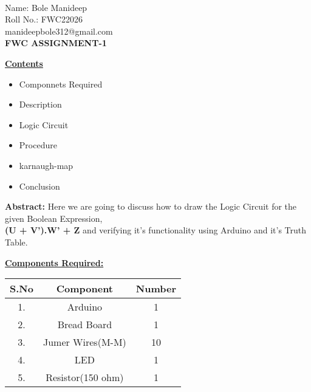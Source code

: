 \documentclass[10pt,a4paper]{report}
\begin{document}
 \vspace{3mm}\\ \raggedleft Name: Bole Manideep\vspace{2mm}\\ \raggedleft Roll No.: FWC22026\vspace{2mm}\\ \raggedleft manideepbole312@gmail.com \vspace{10mm}
\\ \centering \Large \textbf{FWC ASSIGNMENT-1} \normalsize \vspace{15mm}
\begin{multicols}{2} \raggedright \large \textbf{\underline{Contents}} \normalsize \vspace{5mm}
\begin{itemize}
\raggedright  \item Componnets Required \item Description \item Logic Circuit \item Procedure \item karnaugh-map \item Conclusion
\end{itemize} \vspace{5mm}
\raggedright \hspace{10mm} \textbf{Abstract:}  Here we are going to discuss how to draw the Logic Circuit for the given Boolean Expression,\\  \textbf{(U + V').W' + Z} and verifying it's functionality using Arduino and it's Truth Table.\vspace{5mm} 
\\ \raggedright \large \textbf{\underline{Components Required:}} \normalsize \vspace{3mm}

\begin{center}
    \setlength{\arrayrulewidth}{0.1mm}
\setlength{\tabcolsep}{12pt}
\renewcommand{\arraystretch}{1.5}
    \begin{tabular}{|c|c|c|}
    \hline %
      \textbf{S.No} & \textbf{Component} & \textbf{Number}\\
      \hline
	1. & Arduino & 1 \\
	2. & Bread Board & 1 \\
	3. & Jumer Wires(M-M) & 10 \\
	4. & LED & 1 \\
	5. & Resistor(150 ohm) & 1 \\ 
      \hline
      

\end{tabular}
\end{center}
\end{multicols}
\end{document}
